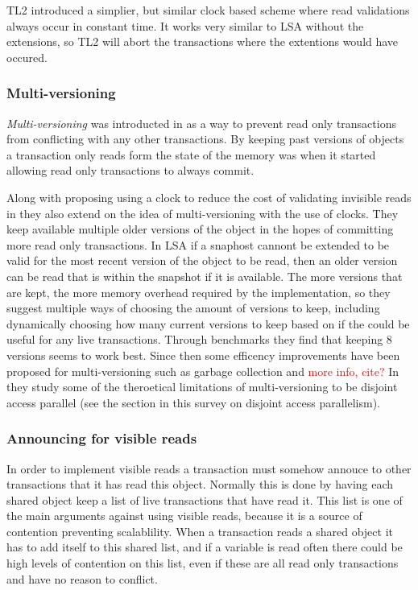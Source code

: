 TL2 \cite{Dice06transactionallocking} introduced a simplier, but similar clock based scheme where read validations always occur in constant time.
It works very similar to LSA without the extensions, so TL2 will abort the transactions where the extentions would have occured.

\subsubsection{Multi-versioning}
\emph{Multi-versioning} was introducted in \cite{1228566} as a way to prevent read only transactions from conflicting with any other transactions.
By keeping past versions of objects a transaction only reads form the state of the memory was when it started allowing read only transactions to always commit.

Along with proposing using a clock to reduce the cost of validating invisible reads in \cite{10.1109/TPDS.2010.49} they also extend on the idea of multi-versioning with the use of clocks.
They keep available multiple older versions of the object in the hopes of committing more read only transactions.
In LSA if a snaphost cannont be extended to be valid for the most recent version of the object to be read, then an older version can be read that is within the snapshot if it is available.
The more versions that are kept, the more memory overhead required by the implementation, so they suggest multiple ways of choosing the amount of versions to keep, including dynamically choosing how many current versions to keep based on if the could  be useful for any live transactions.
Through benchmarks they find that keeping 8 versions seems to work best.
Since then some efficency improvements have been proposed for multi-versioning such as garbage collection and \textcolor{Red}{more info, cite?}
In \cite{1584015} they study some of the theroetical limitations of multi-versioning to be disjoint access parallel (see the section in this survey on disjoint access parallelism).

\subsubsection{Announcing for visible reads}
In order to implement visible reads a transaction must somehow annouce to other transactions that it has read this object.
Normally this is done by having each shared object keep a list of live transactions that have read it.
This list is one of the main arguments against using visible reads, because it is a source of contention preventing scalablility.
When a transaction reads a shared object it has to add itself to this shared list, and if a variable is read often there could be high levels of contention on this list, even if these are all read only transactions and have no reason to conflict.

